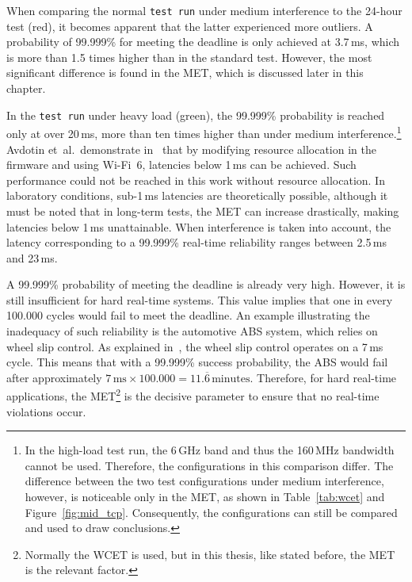When comparing the normal \texttt{test run} under medium interference to the 24-hour test (red), it becomes apparent that the latter experienced more outliers.  
A probability of 99.999\% for meeting the deadline is only achieved at 3.7\,ms, which is more than 1.5 times higher than in the standard test.  
However, the most significant difference is found in the \ac{MET}, which is discussed later in this chapter.  

In the \texttt{test run} under heavy load (green), the 99.999\% probability is reached only at over 20\,ms, more than ten times higher than under medium interference.\footnote{In the high-load test run, the 6\,GHz band and thus the 160\,MHz bandwidth cannot be used. Therefore, the configurations in this comparison differ. The difference between the two test configurations under medium interference, however, is noticeable only in the \ac{MET}, as shown in Table~\ref{tab:wcet} and Figure~\ref{fig:mid_tcp}. Consequently, the configurations can still be compared and used to draw conclusions.}  
Avdotin et~al.\ demonstrate in~\cite[p.~2--3]{Avdotin_2019} that by modifying resource allocation in the firmware and using Wi-Fi~6, latencies below 1\,ms can be achieved.  
Such performance could not be reached in this work without resource allocation.  
In laboratory conditions, sub-1\,ms latencies are theoretically possible, although it must be noted that in long-term tests, the \ac{MET} can increase drastically, making latencies below 1\,ms unattainable.  
When interference is taken into account, the latency corresponding to a 99.999\% real-time reliability ranges between 2.5\,ms and 23\,ms.  

A 99.999\% probability of meeting the deadline is already very high.
However, it is still insufficient for hard real-time systems.  
This value implies that one in every 100.000 cycles would fail to meet the deadline.  
An example illustrating the inadequacy of such reliability is the automotive ABS system, which relies on wheel slip control.  
As explained in~\cite[p.~5]{7075975}, the wheel slip control operates on a 7\,ms cycle.  
This means that with a 99.999\% success probability, the ABS would fail after approximately $7\,\text{ms} \times 100.000 = 11.\overline{6}\,\text{minutes}$.  
Therefore, for hard real-time applications, the \ac{MET}\footnote{Normally the \ac{WCET} is used, but in this thesis, like stated before, the \ac{MET} is the relevant factor.} is the decisive parameter to ensure that no real-time violations occur.  

